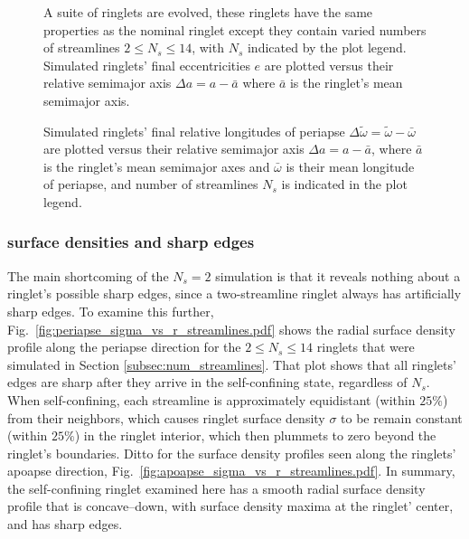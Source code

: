 \documentclass[preprint]{aastex62}
\begin{document}
\begin{figure}
    \caption{
        \label{fig:e_vs_da_streamlines}
        A suite of ringlets are evolved, these ringlets have the same properties as the
        nominal ringlet except they contain varied numbers of streamlines $2\le N_s\le14$,
        with $N_s$ indicated by the plot legend.
        Simulated ringlets' final eccentricities $e$ are plotted versus their relative
        semimajor axis $\Delta a=a-\bar{a}$ where $\bar{a}$ is the ringlet's mean semimajor axis. 
    }
\end{figure}
\begin{figure}
    \caption{
        \label{fig:delta_wt_vs_da_streamlines}
        Simulated ringlets' final relative longitudes of periapse 
        $\Delta\tilde{\omega} = \tilde{\omega} - \bar{\omega}$ are plotted versus their relative
        semimajor axis $\Delta a=a-\bar{a}$, where $\bar{a}$ is the ringlet's mean semimajor axes 
        and $\bar{\omega}$ is their mean longitude of periapse, and number of streamlines $N_s$
        is indicated in the plot legend. 
    }
\end{figure}

\subsubsection{surface densities and sharp edges}
\label{subsubsec:sharp_edges}

The main shortcoming of the $N_s=2$ simulation is that it reveals nothing about a ringlet's
possible sharp edges, since a two-streamline ringlet always has artificially sharp edges.
To examine this further, Fig.\ \ref{fig:periapse_sigma_vs_r_streamlines.pdf} shows the radial 
surface density profile along the periapse direction for the $2\le N_s\le14$ ringlets 
that were simulated in Section \ref{subsec:num_streamlines}. That plot shows that all ringlets'
edges are sharp after they arrive in the self-confining state, regardless of $N_s$. When self-confining,
each streamline is approximately equidistant (within $25\%$) from their neighbors, which causes
ringlet surface density $\sigma$ to be remain constant (within $25\%$) in the ringlet interior, 
which then plummets to zero beyond the ringlet's boundaries. Ditto for the surface density
profiles seen along the ringlets' apoapse direction, Fig.\ \ref{fig:apoapse_sigma_vs_r_streamlines.pdf}.
In summary, the self-confining ringlet examined here has a smooth radial surface density profile that is
concave--down, with surface density maxima at the ringlet' center, and has sharp edges.
\end{document}
